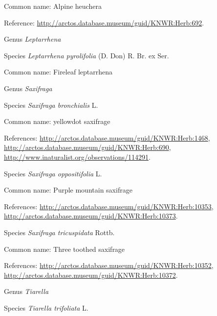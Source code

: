 \documentclass[9pt, article]{memoir}
\begin{document}
\begin{multicols}{2}
Common name: Alpine heuchera

Reference: 
\url{http://arctos.database.museum/guid/KNWR:Herb:692}.

\vspace{6pt}\noindent\hspace{30pt}Genus \textit{Leptarrhena}


\vspace{6pt}\noindent\hspace{36pt}Species \textit{Leptarrhena pyrolifolia} (D. Don) R. Br. ex Ser.


Common name: Fireleaf leptarrhena

\vspace{6pt}\noindent\hspace{30pt}Genus \textit{Saxifraga}


\vspace{6pt}\noindent\hspace{36pt}Species \textit{Saxifraga bronchialis} L.


Common name: yellowdot saxifrage

References: 
\url{http://arctos.database.museum/guid/KNWR:Herb:1468}, 
\url{http://arctos.database.museum/guid/KNWR:Herb:690}, 
\url{http://www.inaturalist.org/observations/114291}.

\vspace{6pt}\noindent\hspace{36pt}Species \textit{Saxifraga oppositifolia} L.


Common name: Purple mountain saxifrage

References: 
\url{http://arctos.database.museum/guid/KNWR:Herb:10353}, 
\url{http://arctos.database.museum/guid/KNWR:Herb:10373}.

\vspace{6pt}\noindent\hspace{36pt}Species \textit{Saxifraga tricuspidata} Rottb.


Common name: Three toothed saxifrage

References: 
\url{http://arctos.database.museum/guid/KNWR:Herb:10352}, 
\url{http://arctos.database.museum/guid/KNWR:Herb:10372}.

\vspace{6pt}\noindent\hspace{30pt}Genus \textit{Tiarella}


\vspace{6pt}\noindent\hspace{36pt}Species \textit{Tiarella trifoliata} L.



\end{multicols}
\end{document}

